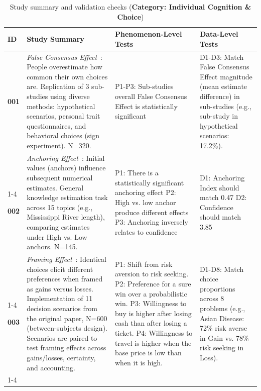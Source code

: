 \begin{table}[htbp]
    \centering
    \caption{Study summary and validation checks (\textbf{Category: Individual Cognition \& Choice})}
    \label{tab:study_summary_individual}
    \begin{tabular}{p{1cm}p{5.5cm}p{4cm}p{4cm}}
        \toprule
        \textbf{ID} & \textbf{Study Summary} & \textbf{Phenomenon-Level Tests} & \textbf{Data-Level Tests} \\
        \midrule
        
           \textbf{001} 
           & \textit{False Consensus Effect}~\cite{}: People overestimate how common their own choices are. \newline Replication of 3 sub-studies using diverse methods: hypothetical scenarios, personal trait questionnaires, and behavioral choices (sign experiment). N=320.
           & P1-P3: Sub-studies overall False Consensus Effect is statistically significant 
           & D1-D3:  Match False Consensus Effect magnitude (mean estimate difference) in sub-studies (e.g., sub-study in hypothetical scenarios: 17.2\%).  \\
           \cmidrule{1-4}
          
         \textbf{002} 
         & \textit{Anchoring Effect}~\cite{}: Initial values (anchors) influence subsequent numerical estimates. \newline General knowledge estimation task across 15 topics (e.g., Mississippi River length), comparing estimates under High vs. Low anchors. N=145. 
         & P1: There is a statistically significant anchoring effect \newline P2: High vs. low anchor produce different effects \newline P3: Anchoring inversely relates to confidence 
          & D1: Anchoring Index should match 0.47 \newline D2: Confidence should match 3.85 \\
         \cmidrule{1-4}
        
         \textbf{003} 
          & \textit{Framing Effect}~\cite{}: Identical choices elicit different preferences when framed as gains versus losses. \newline Implementation of 11 decision scenarios from the original paper, N=600 (between-subjects design). Scenarios are paired to test framing effects across gains/losses, certainty, and accounting.
          & P1: Shift from risk aversion to risk seeking. \newline P2: Preference for a sure win over a probabilistic win. \newline P3: Willingness to buy is higher after losing cash than after losing a ticket. \newline P4: Willingness to travel is higher when the base price is low than when it is high. %
         & D1-D8: Match choice proportions across 8 problems (e.g., Asian Disease: 72\% risk averse in Gain vs. 78\% risk seeking in Loss). \\
          \cmidrule{1-4}
        

\end{tabular}
\end{table}
